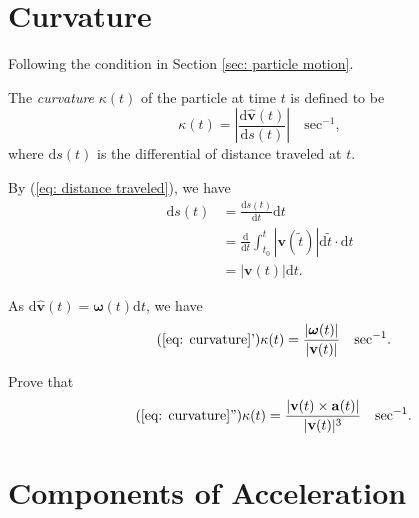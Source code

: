 \section{Curvature}
Following the condition in Section \ref{sec: particle motion}.

The \textit{curvature} $\kappa(t)$ of the particle at time $t$ is defined to be
\begin{equation}
	\label{eq: curvature}
	\kappa(t) = \left| \frac{\mathrm d \mathbf{\hat v}(t)}{\mathrm d s(t)} \right| \quad \mathrm{sec^{-1}},
\end{equation}
where $\mathrm d s(t)$ is the differential of distance traveled at $t$.

By (\ref{eq: distance traveled}), we have
$$
\begin{aligned}
	\mathrm d s(t) &= \frac{\mathrm d s(t)}{\mathrm dt} \mathrm dt \\
	&= \frac{\mathrm d}{\mathrm d t} \int_{t_0}^t | \mathbf v(\tilde t) | \mathrm d \tilde t \cdot \mathrm dt \\
	&= | \mathbf v(t) | \mathrm dt.
\end{aligned}
$$

As $\mathrm d \mathbf{\hat v}(t) = \boldsymbol{\omega}(t) \mathrm d t$, we have
\begin{equation}
	\label{eq: curvature 2}
	\tag{\ref{eq: curvature}'}
	\kappa(t) = \frac{| \boldsymbol{\omega}(t) |}{| \mathbf v(t) |} \quad \mathrm{sec^{-1}}.
\end{equation}


\begin{problem}
	Prove that
	\begin{equation}
		\label{eq: curvature 3}
		\tag{\ref{eq: curvature}''}
		\kappa(t) = \frac{|\mathbf v(t) \times \mathbf a(t)|}{|\mathbf v(t)|^3} \quad \mathrm{sec^{-1}}.
	\end{equation}
\end{problem}






\section{Components of Acceleration}

